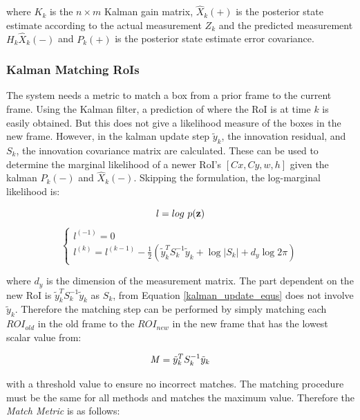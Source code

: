 \documentclass[11pt,twoside]{report}
\begin{document}
where $K_{k}$ is the $n \times m$ Kalman gain matrix, $\hat{X}_{k}(+)$ is the posterior state estimate according to the actual measurement $Z_{k}$ and the predicted measurement $H_{k} \hat{X}_{k}(-)$ and $P_{k}(+)$ is the posterior state estimate error covariance.

\subsubsection{Kalman Matching RoIs}

The system needs a metric to match a box from a prior frame to the current frame. Using the Kalman filter, a prediction of where the RoI is at time $k$ is easily obtained. But this does not give a likelihood measure of the boxes in the new frame. However, in the kalman update step $\tilde{y}_{k}$, the innovation residual, and $S_{k}$, the innovation covariance matrix are calculated. These can be used to determine the marginal likelihood of a newer RoI's $[Cx,Cy,w,h]$ given the kalman $P_{k}(-)$ and $\hat{X}_{k}(-)$. Skipping the formulation, the log-marginal likelihood is:

\begin{equation}
l = log \textnormal{ } p(\mathbf{z})
\end{equation}
\begin{equation}
\begin{cases}
l^{(-1)} = 0 \\
l^{(k)} = l^{(k-1)} - \frac{1}{2} (\tilde{y}_{k}^{T}S_{k}^{-1}\tilde{y}_{k} + \log |S_{k}| + d_{y}\log 2 \pi) 
\end{cases}
\end{equation}

where $d_{y}$ is the dimension of the measurement matrix. The part dependent on the new RoI is $\tilde{y}_{k}^{T}S_{k}^{-1}\tilde{y}_{k}$ as $S_{k}$, from Equation \ref{kalman_update_equs} does not involve $\tilde{y}_{k}$. Therefore the matching step can be performed by simply matching each $ROI_{old}$ in the old frame to the $ROI_{new}$ in the new frame that has the lowest scalar value from:

\begin{equation}
\begin{aligned}
\textnormal{\textit{M}} = \tilde{y}_{k}^{T}S_{k}^{-1}\tilde{y}_{k}
\end{aligned}
\end{equation}

with a threshold value to ensure no incorrect matches. The matching procedure must be the same for all methods and matches the maximum value. Therefore the \textit{Match Metric} is as follows:
\end{document}
